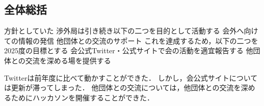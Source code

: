 \subsection*{全体総括}


方針としていた
        渉外局は引き続き以下の二つを目的として活動する
        会外へ向けての情報の発信
        他団体との交流のサポート
    これを達成するため，以下の二つを2025度の目標とする
        会公式Twitter・公式サイトで会の活動を適宜報告する
        他団体との交流を深める場を提供する

Twitterは前年度に比べて動かすことができた．
しかし，会公式サイトについては更新が滞ってしまった．
他団体との交流については，他団体との交流を深めるためにハッカソンを開催することができた．

